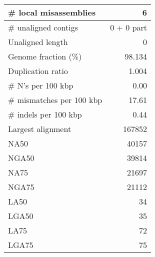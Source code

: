\documentclass[12pt,a4paper]{article}
\begin{document}
\begin{table}[ht]
\begin{center}
\begin{tabular}{|l*{1}{|r}|}
\# local misassemblies & 6 \\ \hline
\# unaligned contigs & 0 + 0 part \\ \hline
Unaligned length & 0 \\ \hline
Genome fraction (\%) & 98.134 \\ \hline
Duplication ratio & 1.004 \\ \hline
\# N's per 100 kbp & 0.00 \\ \hline
\# mismatches per 100 kbp & 17.61 \\ \hline
\# indels per 100 kbp & 0.44 \\ \hline
Largest alignment & 167852 \\ \hline
NA50 & 40157 \\ \hline
NGA50 & 39814 \\ \hline
NA75 & 21697 \\ \hline
NGA75 & 21112 \\ \hline
LA50 & 34 \\ \hline
LGA50 & 35 \\ \hline
LA75 & 72 \\ \hline
LGA75 & 75 \\ \hline
\end{tabular}
\end{center}
\end{table}
\end{document}
